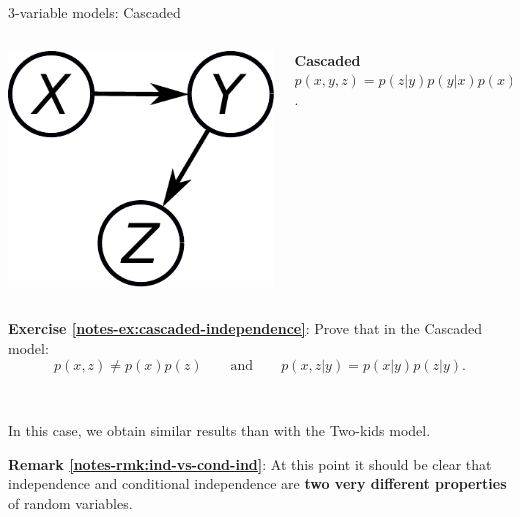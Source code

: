 \documentclass{beamer}
\newcommand{\exercise}[2]{\noindent\colorbox{blue!10}{\parbox{0.995\textwidth}{\textbf{Exercise \ref{notes-ex:#1}}: #2}}\\}
\newcommand{\remark}[2]{\noindent\colorbox{red!10}{\parbox{0.995\textwidth}{\textbf{Remark \ref{notes-rmk:#1}}: #2}}\\}
\begin{document}
\begin{frame}{3-variable models: Cascaded}
\begin{columns}
  \begin{column}{0.12\textwidth}%
   \includegraphics[width=1.2\textwidth]{fig/cascaded-xyz.pdf}
  \end{column}%
  \begin{column}{0.8\textwidth}
  \textbf{Cascaded}\;\; $p(x,y,z) = p(z|y)p(y|x)p(x)$.
  \end{column}
 \end{columns}
 \vspace{4mm}
    \exercise{cascaded-independence}{Prove that in the Cascaded model:
    \begin{equation}
    p(x,z)\neq p(x)p(z) \qquad\text{and}\qquad p(x,z|y) = p(x|y)p(z|y).
    \end{equation}
    }\vspace{2mm}

In this case, we obtain similar results than with the Two-kids model.\vspace{8mm}\pause

\remark{ind-vs-cond-ind}{At this point it should be clear that independence and conditional independence are \textbf{two very different properties} of random variables.}
\end{frame}
\end{document}
